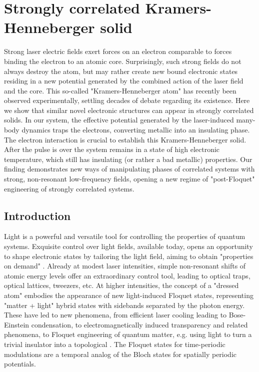 


\chapter{Strongly correlated Kramers-Henneberger solid}
\label{chap:KH_solid}
Strong laser electric fields exert forces on an electron comparable to forces binding the electron to an atomic core. Surprisingly, 
such strong fields do not always destroy the atom, but may rather create new bound electronic states residing in a new potential generated by the combined action of the laser field and the core. This so-called "Kramers-Henneberger atom" has recently been observed experimentally, settling decades of debate regarding its existence. 
Here we show that similar novel electronic structures can appear in strongly correlated solids. In our system, the effective potential generated by the laser-induced many-body dynamics traps the electrons, converting metallic into an insulating phase. The electron interaction is crucial to establish this Kramers-Henneberger solid. After the pulse is over the system remains in a state of high electronic temperature, which still has insulating (or rather a bad metallic) properties.
Our finding demonstrates new ways of manipulating phases 
of correlated systems with strong, non-resonant low-frequency 
fields, opening a new regime of "post-Floquet" engineering of strongly correlated systems. 



\section{Introduction}

Light is a powerful and versatile tool for controlling the properties of quantum systems. Exquisite control over light fields, available today, opens an opportunity to shape electronic states by
tailoring the light field, aiming to obtain "properties on demand" \citep{Basov}. 
Already at modest laser intensities, simple non-resonant shifts of atomic energy levels offer an extraordinary control tool, leading to optical traps, optical lattices, tweezers, \cite{Gao_1} etc. At higher intensities, the concept of a "dressed atom" embodies the appearance of new light-induced Floquet states, 
representing "matter + light" hybrid states with sidebands separated by the photon energy. 
These have led to new phenomena, from 
efficient laser cooling leading to 
Bose-Einstein condensation, to electromagnetically induced transparency and related phenomena, to Floquet engineering of quantum matter, e.g. using light to turn a trivial insulator into a topological \cite{Oka_Aoki_1,Kitamura_AR_2019,Huebener_1}. 
The Floquet states for time-periodic modulations are a temporal analog of the Bloch states for spatially periodic potentials.


